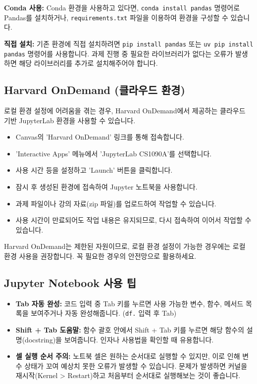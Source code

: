 \documentclass[11pt,a4paper]{book}
\theoremstyle{definition}
\begin{document}
\textbf{Conda 사용:}
Conda 환경을 사용하고 있다면, \texttt{conda install pandas} 명령어로 Pandas를 설치하거나, \texttt{requirements.txt} 파일을 이용하여 환경을 구성할 수 있습니다.

\textbf{직접 설치:}
기존 환경에 직접 설치하려면 \texttt{pip install pandas} 또는 \texttt{uv pip install pandas} 명령어를 사용합니다. 과제 진행 중 필요한 라이브러리가 없다는 오류가 발생하면 해당 라이브러리를 추가로 설치해주어야 합니다.

\subsection{Harvard OnDemand (클라우드 환경)}

로컬 환경 설정에 어려움을 겪는 경우, Harvard OnDemand에서 제공하는 클라우드 기반 JupyterLab 환경을 사용할 수 있습니다.
\begin{itemize}
    \item Canvas의 'Harvard OnDemand' 링크를 통해 접속합니다.
    \item 'Interactive Apps' 메뉴에서 'JupyterLab CS1090A'를 선택합니다.
    \item 사용 시간 등을 설정하고 'Launch' 버튼을 클릭합니다.
    \item 잠시 후 생성된 환경에 접속하여 Jupyter 노트북을 사용합니다.
    \item 과제 파일이나 강의 자료(zip 파일)를 업로드하여 작업할 수 있습니다.
    \item 사용 시간이 만료되어도 작업 내용은 유지되므로, 다시 접속하여 이어서 작업할 수 있습니다.
\end{itemize}
\begin{warningbox}
Harvard OnDemand는 제한된 자원이므로, 로컬 환경 설정이 가능한 경우에는 로컬 환경 사용을 권장합니다. 꼭 필요한 경우의 안전망으로 활용하세요.
\end{warningbox}

\subsection{Jupyter Notebook 사용 팁}

\begin{itemize}
    \item \textbf{Tab 자동 완성:} 코드 입력 중 Tab 키를 누르면 사용 가능한 변수, 함수, 메서드 목록을 보여주거나 자동 완성해줍니다. (\texttt{df.} 입력 후 Tab)
    \item \textbf{Shift + Tab 도움말:} 함수 괄호 안에서 Shift + Tab 키를 누르면 해당 함수의 설명(docstring)을 보여줍니다. 인자나 사용법을 확인할 때 유용합니다.
    \item \textbf{셀 실행 순서 주의:} 노트북 셀은 원하는 순서대로 실행할 수 있지만, 이로 인해 변수 상태가 꼬여 예상치 못한 오류가 발생할 수 있습니다. 문제가 발생하면 커널을 재시작(Kernel > Restart)하고 처음부터 순서대로 실행해보는 것이 좋습니다.
\end{itemize}
\end{document}
